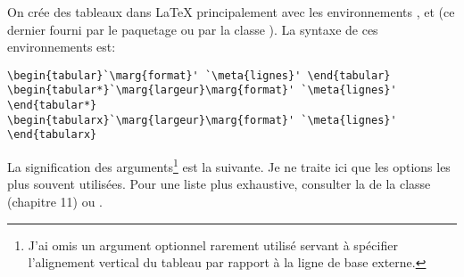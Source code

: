 On crée des tableaux dans {\LaTeX} principalement avec les
environnements ,  et  (ce
dernier fourni par le paquetage  ou par la classe
). La syntaxe de ces environnements est:
\begin{lstlisting}
\begin{tabular}`\marg{format}' `\meta{lignes}' \end{tabular}
\begin{tabular*}`\marg{largeur}\marg{format}' `\meta{lignes}' \end{tabular*}
\begin{tabularx}`\marg{largeur}\marg{format}' `\meta{lignes}' \end{tabularx}
\end{lstlisting}
La signification des arguments\footnote{%
  J'ai omis un argument optionnel rarement utilisé servant à spécifier
  l'alignement vertical du tableau par rapport à la ligne de base
  externe.} %
est la suivante. Je ne traite ici que les options les plus souvent
utilisées. Pour une liste plus exhaustive, consulter la %
de la classe  (chapitre 11) ou %
\citet[section
]{wikilivres:latex}.

